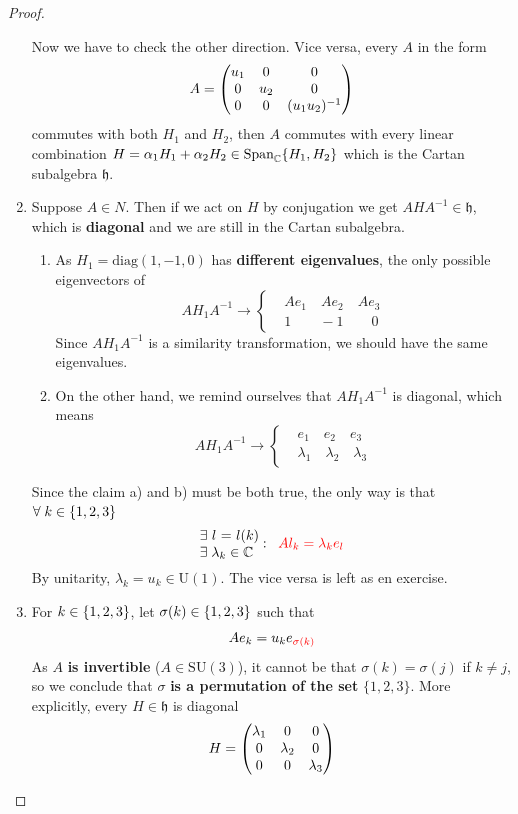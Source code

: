\documentclass[../main.tex]{subfiles}
\begin{document}
\begin{proof}
\begin{enumerate}
    Now we have to check the other direction. Vice versa, every $A$ in the form 
    \[
    A=\mqty(\dmat[0]{u_1,u_2,(u_1u_2)^{-1}})
    \]
    commutes with both $H_1$ and $H_2$, then $A$ commutes with every linear combination $H=\alpha_1H_1+\alpha_2H_2\in\textrm{Span}_{\mathbb{C}}\Bqty{H_1,H_2}$ which is the Cartan subalgebra $\mathfrak{h}$.
    \item Suppose $A\in N$. Then if we act on $H$ by conjugation we get $AHA^{-1}\in\mathfrak{h}$, which is \textbf{diagonal} and we are still in the Cartan subalgebra.
    \begin{enumerate}
        \item As $H_1=\textrm{diag}(1,-1,0)$ has \textbf{different eigenvalues}, the only possible eigenvectors of
        \[
        AH_1A^{-1}\xrightarrow[]{}
        \begin{cases}
        &Ae_1\quad Ae_2 \quad Ae_3\\
        &1\qquad -1\qquad 0
        \end{cases}
        \]
        Since $AH_1A^{-1}$ is a similarity transformation, we should have the same eigenvalues.
        \item On the other hand, we remind ourselves that $AH_1A^{-1}$ is diagonal, which means
        \[
        AH_1A^{-1}\xrightarrow[]{}
        \begin{cases}
        &e_1\quad e_2 \quad e_3\\
        &\lambda_1\quad \lambda_2\quad \lambda_3
        \end{cases}
        \]
    \end{enumerate}
    Since the claim a) and b) must be both true, the only way is that $\forall\;k\in\Bqty{1,2,3}$
    \[
    \parbox{1.5cm}{$\exists\;l=l(k)$ $\exists\;\lambda_k\in\mathbb{C}$}:\;\; {\color{red}Al_k=\lambda_ke_l}
    \]
    By unitarity, $\lambda_k=u_k\in\textrm{U}(1)$. The vice versa is left as en exercise.
    \item For $k\in\Bqty{1,2,3}$, let $\sigma(k)\in\Bqty{1,2,3}$ such that
    \[
    Ae_k=u_ke_{{\color{red}\sigma(k)}}
    \]
    As {\color{red}$A$} \textbf{is invertible} ($A\in\textrm{SU}(3)$), it cannot be that $\sigma(k)=\sigma(j)$ if $k\neq j$, so we conclude that {\color{red}$\sigma$} \textbf{is a permutation of the set} {\color{red}$\{1,2,3\}$}. More explicitly, every $H\in\mathfrak{h}$ is diagonal
    \[
    H=\mqty(\dmat[0]{\lambda_1,\lambda_2,\lambda_3})
\]
\end{enumerate}
\end{proof}
\end{document}
